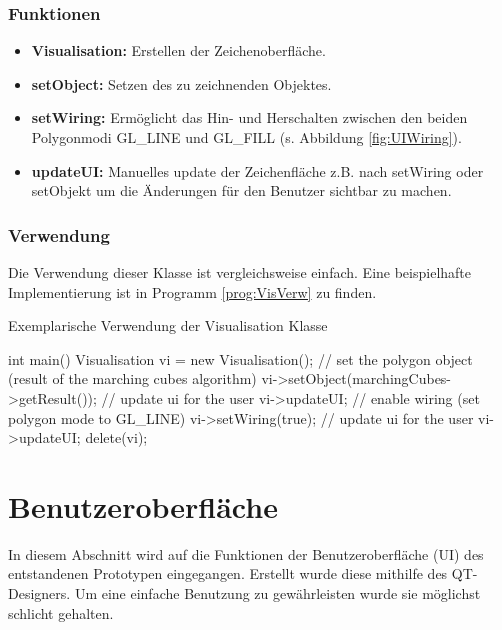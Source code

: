 \subsubsection{Funktionen}
\begin{itemize}
	\item \textbf{Visualisation:} Erstellen der Zeichenoberfläche.
	\item \textbf{setObject:} Setzen des zu zeichnenden Objektes.
	\item \textbf{setWiring:} Ermöglicht das Hin- und Herschalten zwischen den beiden Polygonmodi GL\_LINE und GL\_FILL (s. Abbildung \ref{fig:UIWiring}).
	\item \textbf{updateUI:} Manuelles update der Zeichenfläche z.B. nach setWiring oder setObjekt um die Änderungen für den Benutzer sichtbar zu machen.
\end{itemize}
\subsubsection{Verwendung}
Die Verwendung dieser Klasse ist vergleichsweise einfach. Eine beispielhafte Implementierung ist in Programm \ref{prog:VisVerw} zu finden.
\begin{program}[H]
	\caption{Exemplarische Verwendung der Visualisation Klasse}
	\label{prog:VisVerw}
	\begin{CCode}
		int main(){
			Visualisation vi = new Visualisation();
			// set the polygon object (result of the marching cubes algorithm)
			vi->setObject(marchingCubes->getResult());
			// update ui for the user
			vi->updateUI;
			// enable wiring (set polygon mode to GL\_LINE)
			vi->setWiring(true);
			// update ui for the user
			vi->updateUI;
			delete(vi);
		} 
	\end{CCode}
\end{program}

\section{Benutzeroberfläche}
In diesem Abschnitt wird auf die Funktionen der Benutzeroberfläche (UI) des entstandenen Prototypen eingegangen. Erstellt wurde diese mithilfe des QT-Designers. Um eine einfache Benutzung zu gewährleisten wurde sie möglichst schlicht gehalten.

